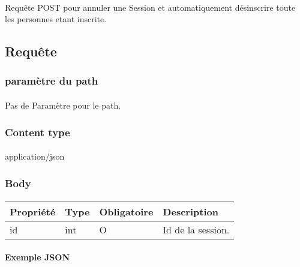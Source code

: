 \paragraph{}
	Requête POST pour annuler une Session et automatiquement désinscrire toute les personnes etant inscrite.

\subsection{Requête}
	\subsubsection{paramètre du path}
		\paragraph{}
			Pas de Paramètre pour le path.
	
	\subsubsection{Content type}
		\paragraph{}
			application/json
			
	\subsubsection{Body}
		\paragraph{}
			\begin{center}
				\begin{tabularx}{\textwidth}{| T{0.2122\textwidth} | S{0.22\textwidth} | S{0.15\textwidth} | S{0.3\textwidth} |}
					\hline
					Propriété & Type & Obligatoire & Description \\
					\hline
					id & int & O & Id de la session. \\
					\hline
				\end{tabularx}
			\end{center}
			
		\paragraph{Exemple JSON}
			\paragraph{}
			


